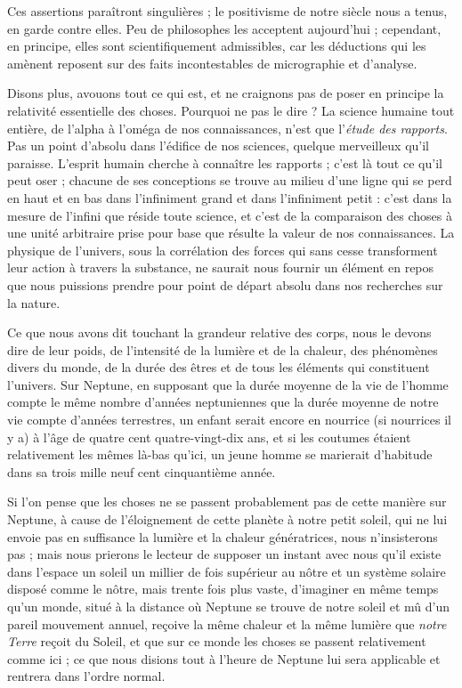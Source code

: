 \documentclass[a4paper, 11pt, oneside, landscape]{article}
\begin{document}
Ces assertions paraîtront singulières ; le positivisme de notre siècle nous a tenus, en garde contre elles. Peu de philosophes les acceptent aujourd'hui ; cependant, en principe, elles sont scientifiquement admissibles, car les déductions qui les amènent reposent sur des faits incontestables de micrographie et d'analyse.

Disons plus, avouons tout ce qui est, et ne craignons pas de poser en principe la relativité essentielle des choses. Pourquoi ne pas le dire ? La science humaine tout entière, de l'alpha à l'oméga de nos connaissances, n'est que l'\emph{étude des rapports}. Pas un point d'absolu dans l'édifice de nos sciences, quelque merveilleux qu'il paraisse. L'esprit humain cherche à connaître les rapports ; c'est là tout ce qu'il peut oser ; chacune de ses conceptions se trouve au milieu d'une ligne qui se perd en haut et en bas dans l'infiniment grand et dans l'infiniment petit : c'est dans la mesure de l'infini que réside toute science, et c'est de la comparaison des choses à une unité arbitraire prise pour base que résulte la valeur de nos connaissances. La physique de l'univers, sous la corrélation des forces qui sans cesse transforment leur action à travers la substance, ne saurait nous fournir un élément en repos que nous puissions prendre pour point de départ absolu dans nos recherches sur la nature.

Ce que nous avons dit touchant la grandeur relative des corps, nous le devons dire de leur poids, de l'intensité de la lumière et de la chaleur, des phénomènes divers du monde, de la durée des êtres et de tous les éléments qui constituent l'univers. Sur Neptune, en supposant que la durée moyenne de la vie de l'homme compte le même nombre d'années neptuniennes que la durée moyenne de notre vie compte d'années terrestres, un enfant serait encore en nourrice (si nourrices il y a) à l'âge de quatre cent quatre-vingt-dix ans, et si les coutumes étaient relativement les mêmes là-bas qu'ici, un jeune homme se marierait d'habitude dans sa trois mille neuf cent cinquantième année.

Si l'on pense que les choses ne se passent probablement pas de cette manière sur Neptune, à cause de l'éloignement de cette planète à notre petit soleil, qui ne lui envoie pas en suffisance la lumière et la chaleur génératrices, nous n'insisterons pas ; mais nous prierons le lecteur de supposer un instant avec nous qu'il existe dans l'espace un soleil un millier de fois supérieur au nôtre et un système solaire disposé comme le nôtre, mais trente fois plus vaste, d'imaginer en même temps qu'un monde, situé à la distance où Neptune se trouve de notre soleil et mû d'un pareil mouvement annuel, reçoive la même chaleur et la même lumière que \emph{notre Terre} reçoit du Soleil, et que sur ce monde les choses se passent relativement comme ici ; ce que nous disions tout à l'heure de Neptune lui sera applicable et rentrera dans l'ordre normal.
\end{document}
